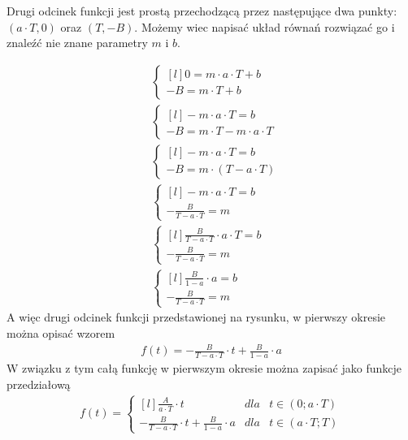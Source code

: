 Drugi odcinek funkcji jest prostą przechodzącą przez następujące dwa punkty: $(a \cdot T,0)$ oraz $(T,-B)$. Możemy wiec napisać układ równań rozwiązać go i znaleźć nie znane parametry $m$ i $b$.

\begin{align*}
&\left\{\begin{matrix*}[l]
0 = m\cdot a \cdot T +b\\ 
-B = m\cdot T +b
\end{matrix*}\right. \\
&\left\{\begin{matrix*}[l]
-m \cdot a \cdot T = b\\ 
-B = m \cdot T -m \cdot a \cdot T
\end{matrix*}\right. \\
&\left\{\begin{matrix*}[l]
-m \cdot a \cdot T = b\\ 
-B = m \cdot \left( T - a \cdot T\right)
\end{matrix*}\right. \\
&\left\{\begin{matrix*}[l]
-m \cdot a \cdot T = b\\ 
-\frac{B}{T - a \cdot T} = m
\end{matrix*}\right. \\
&\left\{\begin{matrix*}[l]
\frac{B}{T - a \cdot T} \cdot a \cdot T = b\\ 
-\frac{B}{T - a \cdot T} = m
\end{matrix*}\right. \\
&\left\{\begin{matrix*}[l]
\frac{B}{1 - a} \cdot a = b\\ 
-\frac{B}{T - a \cdot T} = m
\end{matrix*}\right.
\end{align*}
A więc drugi odcinek funkcji przedstawionej na rysunku, w pierwszy okresie można opisać wzorem
\begin{align*}
f(t) = -\frac{B}{T - a \cdot T}\cdot t + \frac{B}{1 - a} \cdot a
\end{align*}
W związku z tym całą funkcję w pierwszym okresie można zapisać jako funkcje przedziałową
\begin{align*}
f(t) = \left\{\begin{matrix*}[l]
\frac{A}{a \cdot T}\cdot t & dla &t \in (0; a \cdot T)\\ 
-\frac{B}{T - a \cdot T}\cdot t + \frac{B}{1 - a} \cdot a & dla & t \in (a \cdot T; T)
\end{matrix*}\right.
\end{align*}
